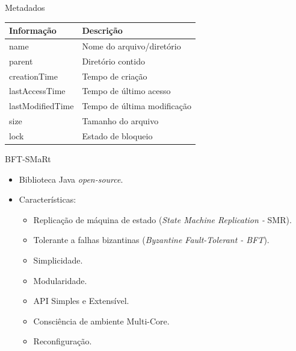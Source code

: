 \begin{frame}{}
	Metadados
	\\
	
	\begin{tabular}{|l|l|} \hline
		\textbf{Informação} & \textbf{Descrição}  \\ \hline
		name			& Nome do arquivo/diretório \\ \hline
		parent			& Diretório contido \\ \hline
		creationTime	& Tempo de criação \\ \hline
		lastAccessTime	& Tempo de último acesso \\ \hline
		lastModifiedTime& Tempo de última modificação \\ \hline
		size			& Tamanho do arquivo \\ \hline
		lock			& Estado de bloqueio \\ \hline
		
	\end{tabular}
	
	
\end{frame}

\begin{frame}{BFT-SMaRt}
	\begin{itemize}
		\item Biblioteca Java \textit{open-source}.
		\item Características:
		\begin{itemize}
			\item Replicação de máquina de estado (\textit{State Machine
				Replication - }SMR).
			\item Tolerante a falhas bizantinas (\textit{Byzantine Fault-Tolerant - BFT}).
			\item Simplicidade.
			\item Modularidade.
			\item API Simples e Extensível.
			\item Consciência de ambiente Multi-Core.	
			\item Reconfiguração.
		\end{itemize}
	\end{itemize}
\end{frame}

